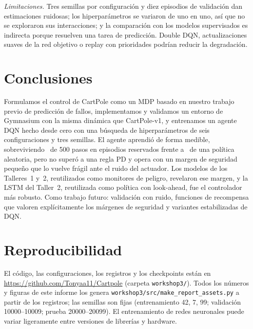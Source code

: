 \documentclass[conference]{IEEEtran}
\begin{document}
\emph{Limitaciones.} Tres semillas por configuración y diez episodios de validación dan
estimaciones ruidosas; los hiperparámetros se variaron de uno en uno, así que no se
exploraron sus interacciones; y la comparación con los modelos supervisados es indirecta
porque resuelven una tarea de predicción. Double DQN, actualizaciones suaves de la red
objetivo o replay con prioridades podrían reducir la degradación.

\section{Conclusiones}
Formulamos el control de CartPole como un MDP basado en nuestro trabajo previo de predicción
de fallos, implementamos y validamos un entorno de Gymnasium con la misma dinámica que
CartPole-v1, y entrenamos un agente DQN hecho desde cero con una búsqueda de hiperparámetros
de seis configuraciones y tres semillas. El agente aprendió de forma medible, sobreviviendo
\TestDQNMean\ de 500 pasos en episodios reservados frente a \TestRandMean\ de una política
aleatoria, pero no superó a una regla PD y opera con un margen de seguridad pequeño que lo
vuelve frágil ante el ruido del actuador. Los modelos de los Talleres~1 y~2, reutilizados
como monitores de peligro, revelaron ese margen, y la LSTM del Taller~2, reutilizada como
política con look-ahead, fue el controlador más robusto. Como trabajo futuro: validación con ruido, funciones
de recompensa que valoren explícitamente los márgenes de seguridad y variantes estabilizadas
de DQN.

\section*{Reproducibilidad}
El código, las configuraciones, los registros y los checkpoints están en
\url{https://github.com/Tonyaa11/Cartpole} (carpeta \texttt{workshop3/}). Todos los números y
figuras de este informe los genera \texttt{workshop3/src/make\_report\_assets.py} a partir de
los registros; las semillas son fijas (entrenamiento 42, 7, 99; validación 10000--10009;
prueba 20000--20099). El entrenamiento de redes neuronales puede variar ligeramente entre
versiones de librerías y hardware.
\end{document}
